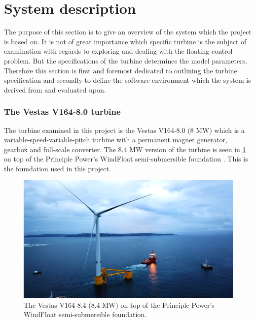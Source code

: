 \section{System description} \label{sec:sys-descr}
The purpose of this section is to give an overview of the system which the project is based on. It is not of great importance which specific turbine is the subject of examination with regards to exploring and dealing with the floating control problem. But the specifications of the turbine determines the model parameters. Therefore this section is first and foremost dedicated to outlining the turbine specification and secondly to define the software environment which the system is derived from and evaluated upon. 

\subsubsection{The Vestas V164-8.0 turbine}
The turbine examined in this project is the Vestas V164-8.0 (8 MW) which is a variable-speed-variable-pitch turbine with a permanent magnet generator, gearbox and full-scale converter. The 8.4 MW version of the turbine is seen in \cref{fig:v164_8.4mw} on top of the Principle Power’s WindFloat semi-submersible foundation \cite{WindFloatAtlantic}. This is the foundation used in this project. 


\begin{figure}[ht]
	\centering
	\includegraphics[width=0.80\linewidth]{Graphics/v164-8_4mw_floating.png}
	\caption{The Vestas V164-8.4 (8.4 MW) on top of the Principle Power’s WindFloat semi-submersible foundation.}
	\label{fig:v164_8.4mw}
\end{figure}

